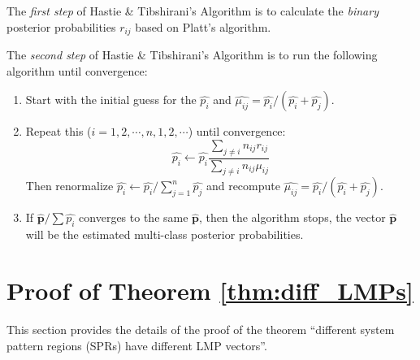 \documentclass[letterpaper, 11pt]{article}
\theoremstyle{plain}
\theoremstyle{definition}
\begin{document}
The \emph{first step} of Hastie \& Tibshirani's Algorithm is to calculate the \emph{binary} posterior probabilities $r_{ij}$ based on Platt's algorithm. 

The \emph{second step} of Hastie \& Tibshirani's Algorithm is to run the following algorithm until convergence:
\begin{enumerate}
  \item Start with the initial guess for the $\hat{p_i}$ and $\hat{\mu_{ij}} = \hat{p_i}/(\hat{p_i}+\hat{p_j} ) $.
  \item Repeat this ($i=1,2,\cdots,n,1,2,\cdots$) until convergence:
\begin{equation}
  \label{eqn:iteration_posterior}
    \hat{p_i} \leftarrow \hat{p_i}\frac{\sum_{j\ne i} n_{ij}r_{ij}}{\sum_{j\ne i} n_{ij}\mu_{ij}}
  \end{equation}
  Then renormalize $\hat{p_i} \leftarrow \hat{p_i}/\sum_{j=1}^n {\hat{p_j}}$ and recompute $\hat{\mu_{ij}} = \hat{p_i}/(\hat{p_i}+\hat{p_j} ) $.
  \item If $\mathbf{\hat{p}}/\sum{\hat{p_i}}$ converges to the same $\mathbf{\hat{p}}$, then the algorithm stops, the vector $\mathbf{\hat{p}}$ will be the estimated multi-class posterior probabilities.
\end{enumerate}



\section{Proof of Theorem \ref{thm:diff_LMPs}} \label{sec:proof_diff_LMP_diff_SPR}
This section provides the details of the proof of the theorem ``different system pattern regions (SPRs) have different LMP vectors''.
\end{document}
